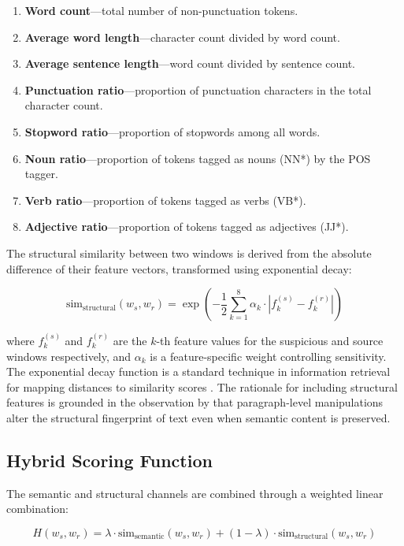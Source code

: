 \documentclass[12pt, a4paper]{article}
\begin{document}
\begin{enumerate}
	\item \textbf{Word count}---total number of non-punctuation tokens.
	\item \textbf{Average word length}---character count divided by word count.
	\item \textbf{Average sentence length}---word count divided by sentence count.
	\item \textbf{Punctuation ratio}---proportion of punctuation characters in the total character count.
	\item \textbf{Stopword ratio}---proportion of stopwords among all words.
	\item \textbf{Noun ratio}---proportion of tokens tagged as nouns (NN*) by the POS tagger.
	\item \textbf{Verb ratio}---proportion of tokens tagged as verbs (VB*).
	\item \textbf{Adjective ratio}---proportion of tokens tagged as adjectives (JJ*).
\end{enumerate}

The structural similarity between two windows is derived from the absolute difference of their feature vectors, transformed using exponential decay:

\begin{equation}
	\text{sim}_{\text{structural}}(w_s, w_r) = \exp\left(-\frac{1}{2} \sum_{k=1}^{8} \alpha_k \cdot |f_k^{(s)} - f_k^{(r)}|\right)
	\label{eq:structural}
\end{equation}

\noindent where $f_k^{(s)}$ and $f_k^{(r)}$ are the $k$-th feature values for the suspicious and source windows respectively, and $\alpha_k$ is a feature-specific weight controlling sensitivity. The exponential decay function is a standard technique in information retrieval for mapping distances to similarity scores \citep{Manning2008}. The rationale for including structural features is grounded in the observation by \citet{Saqaabi2025} that paragraph-level manipulations alter the structural fingerprint of text even when semantic content is preserved.

\subsection{Hybrid Scoring Function}

The semantic and structural channels are combined through a weighted linear combination:

\begin{equation}
	H(w_s, w_r) = \lambda \cdot \text{sim}_{\text{semantic}}(w_s, w_r) + (1 - \lambda) \cdot \text{sim}_{\text{structural}}(w_s, w_r)
	\label{eq:hybrid}
\end{equation}
\end{document}

